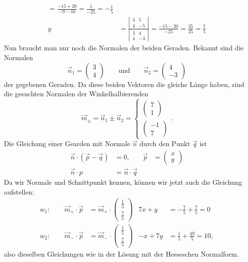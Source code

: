 \begin{loesung}
\begin{align*}
=\frac{-15+20}{-9-16}=\frac{5}{-25}=-\frac15\\
y&=\frac{\left|\,\begin{matrix}3&5\\4&-5\end{matrix}\,\right|}{\left|\,\begin{matrix}3&4\\4&-3\end{matrix}\,\right|}
=\frac{-15-20}{-25}=\frac{35}{25}=\frac75
\end{align*}
Nun braucht man nur noch die Normalen der beiden Geraden. Bekannt sind die Normalen
\[
\vec n_1=\begin{pmatrix}3\\4\end{pmatrix}
\qquad
\text{und}
\qquad
\vec n_2=\begin{pmatrix}4\\-3\end{pmatrix}
\]
der gegebenen Geraden. Da diese beiden Vektoren die gleiche Länge haben,
sind die gesuchten Normalen der Winkelhalbierenden
\[
\vec m_{\pm}=\vec n_1\pm \vec n_2=\begin{cases}
\begin{pmatrix}7\\1\end{pmatrix}\\
\begin{pmatrix}-1\\7\end{pmatrix}
\end{cases}.
\]
Die Gleichung einer Gearden mit Normale $\vec n$ durch den Punkt $\vec q$ ist
\begin{align*}
\vec n\cdot(\vec p-\vec q)&=0,&\vec p&=\begin{pmatrix}x\\y\end{pmatrix}
\\
\vec n\cdot p&=\vec n\cdot\vec q
\end{align*}
Da wir Normale und Schnittpunkt kennen, können wir jetzt auch die Gleichung
aufstellen:
\begin{align*}
w_1:\qquad \vec m_+\cdot\vec p&=\vec m_+\cdot\begin{pmatrix}\frac15\\\frac75\end{pmatrix}&
   7x+y&=-\frac75+\frac{7}5=0
\\
w_2:\qquad\vec m_-\cdot\vec p&=\vec m_-\cdot\begin{pmatrix}\frac15\\\frac75\end{pmatrix}&
   -x+7y&=\frac15+\frac{49}5=10,
\end{align*}
also dieselben Gleichungen wie in der Lösung mit der Hesseschen Normalform.


\end{loesung}
